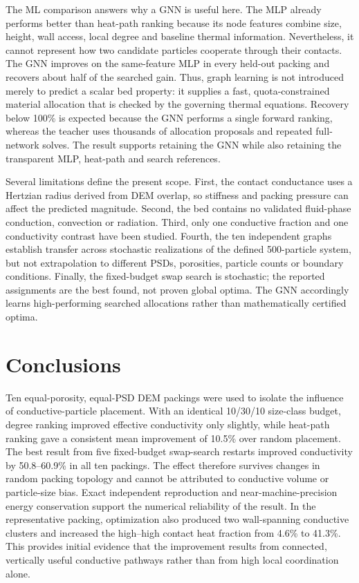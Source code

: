 \documentclass[12pt,a4paper]{article}
\begin{document}
	The ML comparison answers why a GNN is useful here. The MLP already performs
	better than heat-path ranking because its node features combine size, height,
	wall access, local degree and baseline thermal information. Nevertheless, it
	cannot represent how two candidate particles cooperate through their contacts.
	The GNN improves on the same-feature MLP in every held-out packing and recovers
	about half of the searched gain. Thus, graph learning is not introduced merely
	to predict a scalar bed property: it supplies a fast, quota-constrained material
	allocation that is checked by the governing thermal equations. Recovery below
	100\% is expected because the GNN performs a single forward ranking, whereas the
	teacher uses thousands of allocation proposals and repeated full-network solves.
	The result supports retaining the GNN while also retaining the transparent MLP,
	heat-path and search references.
	
	Several limitations define the present scope. First, the contact conductance
	uses a Hertzian radius derived from DEM overlap, so stiffness and packing
	pressure can affect the predicted magnitude. Second, the bed contains no
	validated fluid-phase conduction, convection or radiation. Third, only one
	conductive fraction and one conductivity contrast have been studied. Fourth,
	the ten independent graphs establish transfer across stochastic realizations of
	the defined 500-particle system, but not extrapolation to different PSDs,
	porosities, particle counts or boundary conditions. Finally, the fixed-budget
	swap search is stochastic; the reported assignments are the best found, not proven global
	optima. The GNN accordingly learns high-performing searched allocations rather
	than mathematically certified optima.
	
	\section{Conclusions}
	
	Ten equal-porosity, equal-PSD DEM packings were used to isolate the influence
	of conductive-particle placement. With an identical 10/30/10 size-class budget,
	degree ranking improved effective conductivity only slightly, while heat-path
	ranking gave a consistent mean improvement of 10.5\% over random placement.
	The best result from five fixed-budget swap-search restarts improved conductivity by 50.8--60.9\% in
	all ten packings. The effect therefore survives changes in random packing
	topology and cannot be attributed to conductive volume or particle-size bias.
	Exact independent reproduction and near-machine-precision energy conservation
	support the numerical reliability of the result. In the representative packing,
	optimization also produced two wall-spanning conductive clusters and increased
	the high--high contact heat fraction from 4.6\% to 41.3\%. This provides initial
	evidence that the improvement results from connected, vertically useful
	conductive pathways rather than from high local coordination alone.
\end{document}
